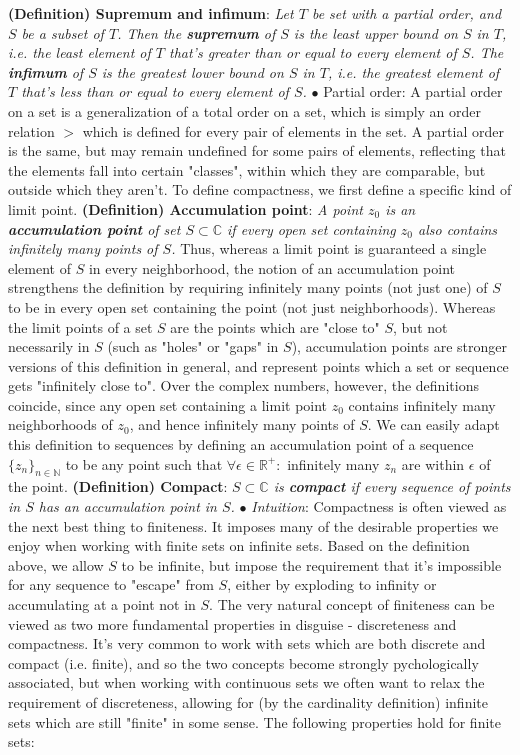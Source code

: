 \documentclass{article}
\newcommand*{\tb}{\textbf}
\newcommand*{\ti}{\textit}
\newcommand*{\n}{\newline}
\newcommand*{\nn}{\newline \newline}
\newcommand*{\In}{\indent \ensuremath{\bullet} \textit{Intuition}: }
\newcommand*{\N}{\mathbb{N}}
\newcommand*{\R}{\mathbb{R}}
\newcommand*{\C}{\mathbb{C}}
\begin{document}
\nn
\tb{(Definition) Supremum and infimum}: \ti{Let $ T $ be set with a partial order, and $ S $ be a subset of $ T $. Then the \tb{supremum} of $ S $ is the least upper bound on $ S $ in $ T $, i.e. the least element of $ T $ that's greater than or equal to every element of $ S $. The \tb{infimum} of $ S $ is the greatest lower bound on $ S $ in $ T $, i.e. the greatest element of $ T $ that's less than or equal to every element of $ S $.}
\n
\indent $ \bullet $ Partial order: A partial order on a set is a generalization of a total order on a set, which is simply an order relation $ > $ which is defined for every pair of elements in the set. A partial order is the same, but may remain undefined for some pairs of elements, reflecting that the elements fall into certain "classes", within which they are comparable, but outside which they aren't.
\nn
To define compactness, we first define a specific kind of limit point.
\nn
\tb{(Definition) Accumulation point}: \ti{A point $ z_0 $ is an \tb{accumulation point} of set $ S \subset \C $ if every open set containing $ z_0 $ also contains infinitely many points of $ S $.}
\nn
Thus, whereas a limit point is guaranteed a single element of $ S $ in every neighborhood, the notion of an accumulation point strengthens the definition by requiring infinitely many points (not just one) of $ S $ to be in every open set containing the point (not just neighborhoods). Whereas the limit points of a set $ S $ are the points which are "close to" $ S $, but not necessarily in $ S $ (such as "holes" or "gaps" in $ S $), accumulation points are stronger versions of this definition in general, and represent points which a set or sequence gets "infinitely close to". Over the complex numbers, however, the definitions coincide, since any open set containing a limit point $ z_0 $ contains infinitely many neighborhoods of $ z_0 $, and hence infinitely many points of $ S $. We can easily adapt this definition to sequences by defining an accumulation point of a sequence $ \{ z_n \}_{n \in \N} $ to be any point such that $ \forall \epsilon \in \R^+: $ infinitely many $ z_n $ are within $ \epsilon $ of the point.
\nn
\tb{(Definition) Compact}: \ti{$ S \subset \C $ is \tb{compact} if every sequence of points in $ S $ has an accumulation point in $ S $.}
\n
\In Compactness is often viewed as the next best thing to finiteness. It imposes many of the desirable properties we enjoy when working with finite sets on infinite sets. Based on the definition above, we allow $ S $ to be infinite, but impose the requirement that it's impossible for any sequence to "escape" from $ S $, either by exploding to infinity or accumulating at a point not in $ S $. The very natural concept of finiteness can be viewed as two more fundamental properties in disguise - discreteness and compactness. It's very common to work with sets which are both discrete and compact (i.e. finite), and so the two concepts become strongly pychologically associated, but when working with continuous sets we often want to relax the requirement of discreteness, allowing for (by the cardinality definition) infinite sets which are still "finite" in some sense. The following properties hold for finite sets:
\end{document}
